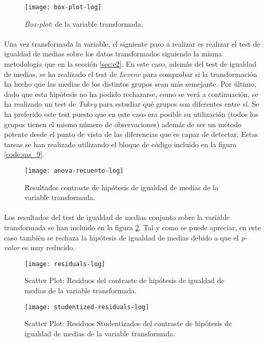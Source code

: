 \documentclass[11pt]{article}
\begin{document}
      \begin{figure}
        \centering
        \texttt{[image: box-plot-log]}
        \caption{\emph{Box-plot}: de la variable transformada.}
        \label{img:box-plot-log}
      \end{figure}

      \paragraph{}
      Una vez transformada la variable, el siguiente paso a realizar es realizar el test de igualdad de medias sobre los datos transformados siguiendo la misma metodología que en la sección \ref{sec:e2}. En este caso, además del test de igualdad de medias, se ha realizado el test de \emph{Levene} para comprobar si la transformación ha hecho que las medias de los distintos grupos sean más semejante. Por último, dado que esta hipótesis no ha podido rechazarse, como se verá a continuación, se ha realizado un test de \emph{Tukey} para estudiar qué grupos son diferentes entre sí. Se ha preferido este test puesto que en este caso era posible su utilización (todos los grupos tienen el mismo número de observaciones) además de ser un método potente desde el punto de vista de las diferencias que es capaz de detectar. Estas tareas se han realizado utilizando el bloque de código incluido en la figura \ref{code:sas_9}.

      \begin{figure}[!h]
        \centering
        \texttt{[image: anova-recuento-log]}
        \caption{Resultados contraste de hipótesis de igualdad de medias de la variable transformada.}
        \label{img:anova-recuento-log}
      \end{figure}

      \paragraph{}
      Los resultados del test de igualdad de medias conjunto sobre la variable transformada se han incluido en la figura \ref{img:anova-recuento-log}. Tal y como se puede apreciar, en este caso también se rechaza la hipótesis de igualdad de medias debido a que el \emph{p-valor} es muy reducido.

      \begin{figure}[!h]
        \centering
        \begin{minipage}{.49\textwidth}
          \centering
          \texttt{[image: residuals-log]}
          \caption{Scatter Plot: Residuos del contraste de hipótesis de igualdad de medias de la variable transformada.}
          \label{fig:scatter-plot-residuals-log}
        \end{minipage}
        \begin{minipage}{.49\textwidth}
          \centering
          \texttt{[image: studentized-residuals-log]}
          \caption{Scatter Plot: Residuos Studentizados del contraste de hipótesis de igualdad de medias de la variable transformada.}
          \label{fig:scatter-plot-studentized-residuals-log}
        \end{minipage}
      \end{figure}
\end{document}
